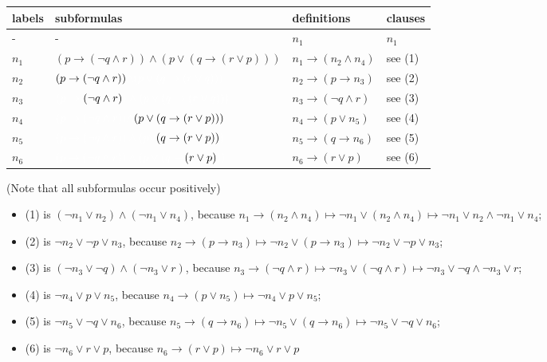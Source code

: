 \documentclass[11pt,a4paper]{article}
\begin{document}
\begin{center}
\begin{tabular}{| l | l | l | l | }
\hline
labels & subformulas & definitions & clauses \\
\hline
- & - & $n_1$ & $n_1$ \\
$n_1$ & $(p \to (\neg q \land r)) \land (p \lor (q \to (r \lor p)))$ & $n_1 \to (n_2 \land n_4) $ & see (1) \\
$n_2$ & $(p \to (\neg q \land r)) \textcolor{white}{\land (p \lor (q \to (r \lor q)))}$ & $n_2 \to (p \to n_3) $ & see (2) \\
$n_3$ & $\textcolor{white}{(p \to} \;(\neg q \land r)\textcolor{white}{) \land (p \lor (q \to (r \lor q)))}$ & $ n_3 \to (\neg q \land r)$ & see (3)\\
$n_4$ & $\textcolor{white}{(p \to (\neg q \land r)) \land }(p \lor (q \to (r \lor p)))$ & $n_4 \to (p \lor n_5) $ & see (4)\\
$n_5$ & $\textcolor{white}{(p \to (\neg q \land r)) \land (p \lor }(q \to (r \lor p))\textcolor{white}{)}$ & $n_5 \to (q \to n_6)$ & see (5)\\
$n_6$ & $\textcolor{white}{(p \to (\neg q \land r)) \land (p \lor (q \to} (r \lor p)\textcolor{white}{))}$ & $n_6 \to (r \lor p) $ & see (6) \\
\hline
\end{tabular}
\end{center}
(Note that all subformulas occur positively)


\begin{itemize}
\item (1) is $(\neg n_1 \lor n_2 )\land (\neg  n_1 \lor n_4) $, because $n_1 \to (n_2 \land n_4)  \mapsto \neg n_1 \lor (n_2 \land n_4) \mapsto \neg n_1 \lor n_2 \land \neg  n_1 \lor n_4$;
\item (2) is $\neg n_2 \lor \neg p \lor n_3 $, because $n_2 \to (p \to n_3) \mapsto \neg n_2 \lor (p \to n_3) \mapsto \neg n_2 \lor \neg p \lor n_3$;
\item (3) is $(\neg n_3 \lor \neg q) \land (\neg n_3 \lor r)$, because $n_3 \to (\neg q \land r) \mapsto \neg n_3 \lor (\neg q \land r) \mapsto\neg  n_3 \lor \neg q \land \neg n_3 \lor r$;
\item (4) is $\neg n_4 \lor p \lor n_5$, because $n_4 \to (p \lor n_5) \mapsto \neg n_4 \lor p \lor n_5$;
\item (5) is $\neg n_5 \lor \neg q \lor n_6$, because $n_5 \to (q \to n_6) \mapsto \neg n_5 \lor (q \to n_6) \mapsto  \neg n_5 \lor \neg q \lor n_6$;
\item (6) is $\neg n_6 \lor r \lor p$, because $n_6 \to (r \lor p) \mapsto \neg n_6 \lor r \lor p$
\end{itemize}
\end{document}
